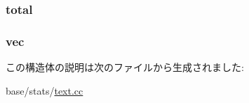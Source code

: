 \label{structStats_1_1VectorPrint_a1bd9e61da02e0bbea57d9e263878e5f3}
\hypertarget{structStats_1_1VectorPrint_a7e957a9c5865c112db82214b368136e6}{
\subsubsection[{total}]{ {\bf total}}}
\label{structStats_1_1VectorPrint_a7e957a9c5865c112db82214b368136e6}
\hypertarget{structStats_1_1VectorPrint_a539785a2cf8aa37d52a6023051f9f797}{
\subsubsection[{vec}]{ {\bf vec}}}
\label{structStats_1_1VectorPrint_a539785a2cf8aa37d52a6023051f9f797}


この構造体の説明は次のファイルから生成されました:\begin{DoxyCompactItemize}
\item 
base/stats/\hyperlink{text_8cc}{text.cc}\end{DoxyCompactItemize}
